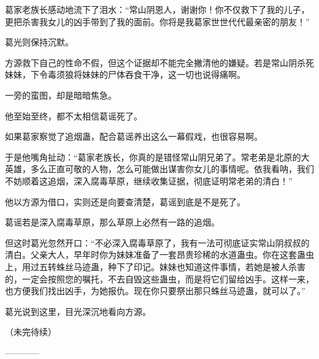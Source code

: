 \begin{this_body}
葛家老族长感动地流下了泪水：“常山阴恩人，谢谢你！你不仅救下了我的儿子，更把杀害我女儿的凶手带到了我的面前。你将是我葛家世世代代最亲密的朋友！”

葛光则保持沉默。

方源救下自己的性命不假，但这个证据却不能完全撇清他的嫌疑。若是常山阴杀死妹妹，下令毒须狼将妹妹的尸体吞食干净，这一切也说得痛啊。

一旁的蛮图，却是暗暗焦急。

他至始至终，都不太相信葛谣死了。

如果葛家察觉了追烟蛊，配合葛谣养出这么一幕假戏，也很容易啊。

于是他嘴角扯动：“葛家老族长，你真的是错怪常山阴兄弟了。常老弟是北原的大英雄，多么正直可敬的人物，怎么可能做出谋害你女儿的事情呢。依我看呐，我们不妨顺着这追烟，深入腐毒草原，继续收集证据，彻底证明常老弟的清白！”

他以方源为借口，实则还是向要查清楚，葛谣到底是不是死了。

葛谣若是深入腐毒草原，那么草原上必然有一路的追烟。

但这时葛光忽然开口：“不必深入腐毒草原了，我有一法可彻底证实常山阴叔叔的清白。父亲大人，早年时你为妹妹准备了一套昂贵珍稀的水道蛊虫。你在这套蛊虫上，用过五转蛛丝马迹蛊，种下了印记。妹妹也知道这件事情，若她是被人杀害的，一定会按照您的嘱托，不去自毁这些蛊虫，而是将它们留给凶手。这样一来，也方便我们找出凶手，为她报仇。现在你只要祭出那只蛛丝马迹蛊，就可以了。”

葛光说到这里，目光深沉地看向方源。

（未完待续）

------------

\end{this_body}


